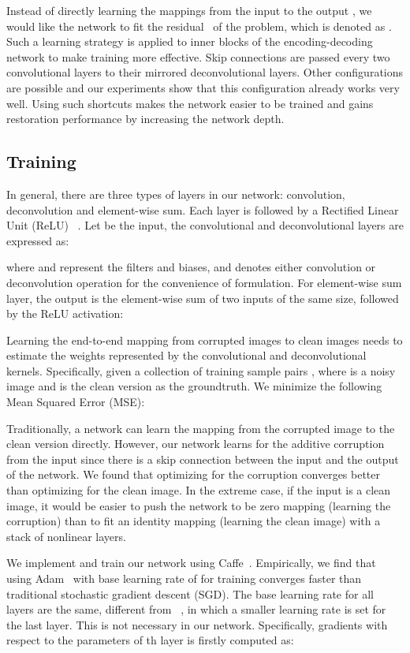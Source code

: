 \documentclass[10pt,journal,compsoc]{IEEEtran}
\begin{document}
Instead of directly learning the mappings from the input  to the output , we would like the network
to fit the residual~\cite{DBLP:journals/corr/HeZRS15} of the problem, which is denoted as .
Such a learning strategy is applied to inner blocks of the encoding-decoding network to make training more
effective. Skip connections are passed every two convolutional layers to their mirrored deconvolutional
layers. Other configurations are possible and our experiments show that this configuration already works
very well. Using such shortcuts makes the network easier to be trained and gains restoration performance
by increasing the network depth.




\subsection{Training}

In general, there are three types of layers in our network: convolution, deconvolution
and element-wise sum. Each layer is followed by a Rectified Linear Unit (ReLU)
~\cite{DBLP:conf/icml/NairH10}. Let  be the input, the convolutional and
deconvolutional layers are expressed as:

where  and  represent the filters and biases, and  denotes either
convolution or deconvolution operation for the convenience of formulation.
For element-wise sum layer, the output is the element-wise sum of two inputs
of the same size, followed by the ReLU activation:


Learning the end-to-end mapping from corrupted images to clean images needs to
estimate the weights  represented by the convolutional and deconvolutional
kernels. Specifically, given a collection of  training sample pairs ,
where  is a noisy image and  is the clean version as the groundtruth.
We minimize the following Mean Squared Error (MSE):


Traditionally, a  network can learn the mapping from the corrupted image to the clean version
directly. However, our network learns for the additive corruption from the input since there
is a skip connection between the input and the output of the network.
We found that optimizing for the corruption converges better than
optimizing for the clean image. In the extreme case, if the input is a clean image, it would be easier
to push the network to be zero mapping (learning the corruption) than to fit an identity
mapping (learning the clean image) with a stack of nonlinear layers.

We implement and train our network using Caffe~\cite{jia2014caffe}. Empirically, we find
that using Adam~\cite{DBLP:journals/corr/KingmaB14} with base learning rate of  for
training converges faster than traditional stochastic gradient descent (SGD). The base
learning rate for all layers are the same, different from ~\cite{DBLP:journals/pami/DongLHT16,
DBLP:conf/nips/JainS08}, in which a smaller learning rate is set for the last layer.
This  is not necessary in our network. Specifically, gradients with respect to the
parameters of th layer is firstly computed as:
\end{document}
